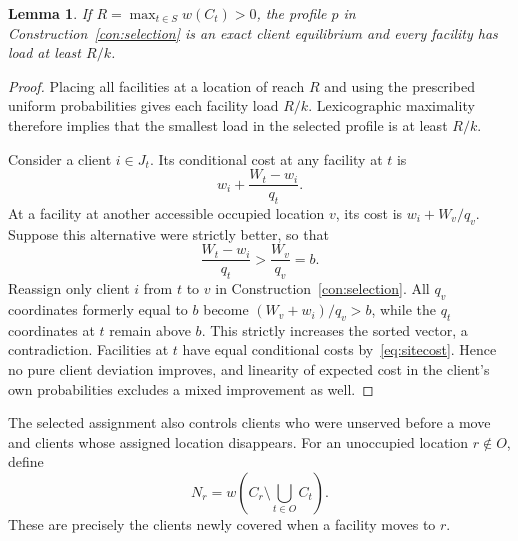 \documentclass[11pt]{amsart}
\newtheorem{lemma}[theorem]{Lemma}
\theoremstyle{definition}
\begin{document}
\begin{lemma}\label{lem:onpath}
If $R=\max_{t\in S}w(C_t)>0$, the profile $p$ in Construction~\ref{con:selection} is an exact client equilibrium and every facility has load at least $R/k$.
\end{lemma}
\begin{proof}
Placing all facilities at a location of reach $R$ and using the prescribed uniform probabilities gives each facility load $R/k$. Lexicographic maximality therefore implies that the smallest load in the selected profile is at least $R/k$.

Consider a client $i\in J_t$. Its conditional cost at any facility at $t$ is
\begin{equation}\label{eq:sitecost}
 w_i+\frac{W_t-w_i}{q_t}.
\end{equation}
At a facility at another accessible occupied location $v$, its cost is $w_i+W_v/q_v$. Suppose this alternative were strictly better, so that
\[
 \frac{W_t-w_i}{q_t}>\frac{W_v}{q_v}=b.
\]
Reassign only client $i$ from $t$ to $v$ in Construction~\ref{con:selection}. All $q_v$ coordinates formerly equal to $b$ become $(W_v+w_i)/q_v>b$, while the $q_t$ coordinates at $t$ remain above $b$. This strictly increases the sorted vector, a contradiction. Facilities at $t$ have equal conditional costs by~\eqref{eq:sitecost}. Hence no pure client deviation improves, and linearity of expected cost in the client's own probabilities excludes a mixed improvement as well.
\end{proof}

The selected assignment also controls clients who were unserved before a move and clients whose assigned location disappears. For an unoccupied location $r\notin O$, define
\begin{equation}\label{eq:newweight}
 N_r=w\left(C_r\setminus\bigcup_{t\in O}C_t\right).
\end{equation}
These are precisely the clients newly covered when a facility moves to $r$.
\end{document}
